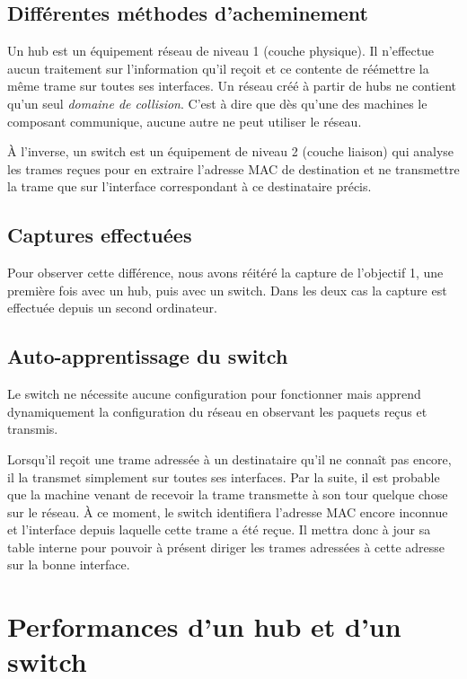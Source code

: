 \documentclass[11pt,a4paper]{article}
\begin{document}
\subsection{Différentes méthodes d'acheminement}

Un hub est un équipement réseau de niveau 1 (couche physique). Il n'effectue aucun traitement sur l'information qu'il reçoit et ce contente de réémettre la même trame sur toutes ses interfaces. Un réseau créé à partir de hubs ne contient qu'un seul \textit{domaine de collision}. C'est à dire que dès qu'une des machines le composant communique, aucune autre ne peut utiliser le réseau.

À l'inverse, un switch est un équipement de niveau 2 (couche liaison) qui analyse les trames reçues pour en extraire l'adresse MAC de destination et ne transmettre la trame que sur l'interface correspondant à ce destinataire précis.

\subsection{Captures effectuées}

Pour observer cette différence, nous avons réitéré la capture de l'objectif 1, une première fois avec un hub, puis avec un switch. Dans les deux cas la capture est effectuée depuis un second ordinateur.

\subsection{Auto-apprentissage du switch}

Le switch ne nécessite aucune configuration pour fonctionner mais apprend dynamiquement la configuration du réseau en observant les paquets reçus et transmis.

Lorsqu'il reçoit une trame adressée à un destinataire qu'il ne connaît pas encore, il la transmet simplement sur toutes ses interfaces. Par la suite, il est probable que la machine venant de recevoir la trame transmette à son tour quelque chose sur le réseau. À ce moment, le switch identifiera l'adresse MAC encore inconnue et l'interface depuis laquelle cette trame a été reçue. Il mettra donc à jour sa table interne pour pouvoir à présent diriger les trames adressées à cette adresse sur la bonne interface.

\section{Performances d'un hub et d'un switch}
\end{document}
